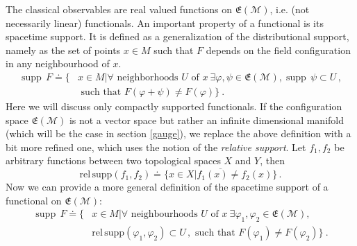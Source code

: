 \documentclass[12pt]{article}
\newcommand{\E}{\mathfrak{E}}
\newcommand{\Mcal}{\mathcal{M}}
\newcommand{\relsupp}{{\mathrm{rel}\,\mathrm{supp}}}      %
\DeclareMathOperator{\supp}{\mathrm{supp}}      %
\newcommand{\ph}{\varphi}
\newcommand{\1}{\mathds{1}}                         %
\begin{document}
{The classical observables are real valued functions on $\mathfrak{E}(\Mcal)$, i.e. (not necessarily linear) functionals. An important property of a functional is its spacetime support. It is defined as a generalization of the distributional support, namely as the set of points $x\in M$ such that $F$ depends on the field configuration in any neighbourhood of $x$.
\begin{align}\label{support}
\supp\, F\doteq\{ & x\in M|\forall \text{ neighborhoods }U\text{ of }x\ \exists \ph,\psi\in\E(\Mcal), \supp\,\psi\subset U\,,
\\ & \text{ such that }F(\ph+\psi)\not= F(\ph)\}\ .\nonumber
\end{align}
Here we will discuss only compactly supported functionals. If the configuration space  $\mathfrak{E}(\Mcal)$ is not a vector space but rather an infinite dimensional manifold (which will be the case in section \ref{gauge}), we replace the above definition with a bit more refined one, which uses the notion of the \textit{relative support}. Let $f_1,f_2$ be arbitrary functions between two topological spaces $X$ and $Y$, then
 \[
 \relsupp (f_1,f_2)\doteq \overline{\{x\in X| f_1(x)\neq f_2(x)\}}\,.
 \]
 Now we can provide a more general definition of the spacetime support of a functional on $\E(\Mcal)$:
 \begin{align}\label{support2}
\supp\, F\doteq\{ & x\in M|\forall \text{ neighbourhoods }U\text{ of }x\ \exists \ph_1,\ph_2\in\E(\Mcal), 
\\ & \relsupp(\ph_1,\ph_2)\subset U\,, \text{ such that }F(\ph_1)\not= F(\ph_2)\}\ .\nonumber
\end{align}

}
\end{document}
